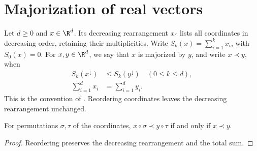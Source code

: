 \section{Majorization of real vectors}

\begin{definition}
    \label{def:vector_majorization}
    \leanok
    Let $d\geq 0$ and $x\in\R^d$. Its decreasing rearrangement
    $x^\downarrow$ lists all coordinates in decreasing order, retaining
    their multiplicities. Write $S_k(x)=\sum_{i=1}^k x_i$, with $S_0(x)=0$.
    For $x,y\in\R^d$, we say that $x$ is majorized by $y$, and write
    $x\prec y$, when
    \begin{align}
        S_k(x^\downarrow)&\leq S_k(y^\downarrow) \quad (0\leq k\leq d),
        \label{eq:vector_majorization_prefix}\\
        \sum_{i=1}^d x_i&=\sum_{i=1}^d y_i.
        \label{eq:vector_majorization_total}
    \end{align}
    This is the convention of \cite[Equation~(8.16)]{Wolf2012Quantum}.
    Reordering coordinates leaves the decreasing rearrangement unchanged.
\end{definition}

\begin{lemma}
    \label{lem:vector_majorization_permutations}
    \leanok
    For permutations $\sigma,\tau$ of the coordinates,
    $x\circ\sigma\prec y\circ\tau$ if and only if $x\prec y$.
\end{lemma}
\begin{proof}\leanok
    Reordering preserves the decreasing rearrangement and the total sum.
\end{proof}

